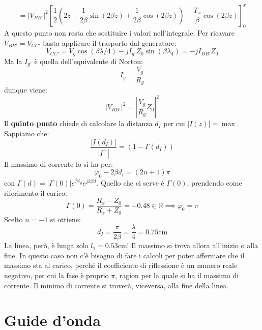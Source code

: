 \documentclass{book}
\begin{document}
    \begin{equation}
        =|V_{BB'}| ^{2}[\frac{1}{2}(2z+\frac{1}{2\beta}\sin(2\beta z)+\frac{1}{2\beta}\cos(2\beta z))-\frac{T_{x}}{\beta}\cos(2\beta z)]^{x} _{0}
    \end{equation}
    A questo punto non resta che sostituire i valori nell'integrale. Per ricavare $V_{BB'}=V_{CC'}$ basta applicare il trasporto dal generatore:
    \begin{equation}
        V_{CC'} = V_{g}\cos(\beta \lambda/4)-jI_{g'}Z_{0}\sin(\beta \lambda_{4}) = -jI_{BB'}Z_{0}
    \end{equation}
    Ma la $I_{g'}$ è quella dell'equivalente di Norton:
    \begin{equation}
        I_{g} = \frac{V_{g}}{R_{g}}
    \end{equation}
    dunque viene:
    \begin{equation}
        |V_{BB'}|^{2}=|\frac{V_{g}}{R_{g}}Z_{0}|^{2}
    \end{equation}
    Il \textbf{quinto punto} chiede di calcolare la distanza $d_{I}$ per cui $|I(z)|=\max$. Sappiamo che:
    \begin{equation}
        \frac{|I(d_{I})|}{|I^{+}|} = (1-\Gamma(d_{I}))
    \end{equation}
    Il massimo di corrente lo si ha per:
    \begin{equation}
        \varphi_{0}-2\beta d_{i} = (2n+1)\pi
    \end{equation}
    con $\Gamma(d) =|\Gamma(0)|e^{j\varphi_{0}}e^{j2\beta d}$. Quello che ci serve è $\Gamma(0)$, prendendo come riferimento il carico:
    \begin{equation}
        \Gamma(0) = \frac{R_{x}-Z_{0}}{R_{x}+Z_{0}} = -0.48 \in \mathbb{R} \implies \varphi_{0} = \pi
    \end{equation}
    Scelto $n=-1$ si ottiene:
    \begin{equation}
        d_{I} = \frac{\pi}{2\beta} = \frac{\lambda}{4} = 0.75\textrm{cm}
    \end{equation}
    La linea, però, è lunga solo $l_{1}=0.53\textrm{cm}$! Il massimo si trova allora all'inizio o alla fine.
    In questo caso non c'è bisogno di fare i calcoli per poter affermare che il massimo sta al carico, perché il coefficiente 
    di riflessione è un numero reale negativo, per cui la fase è proprio $\pi$, ragion per la quale si ha il massimo di corrente. Il minimo
    di corrente si troverà, viceversa, alla fine della linea.


    \section{Guide d'onda}
\end{document}
